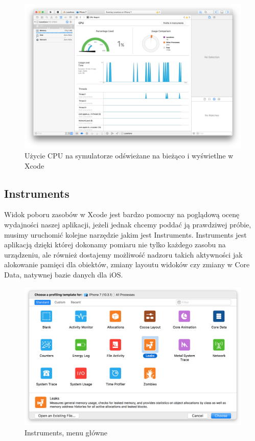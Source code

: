 \begin{figure}[ht!]
  \centering
  \includegraphics[width=120mm]{images/chapter-2-image-5-debugger.png}
  \caption{Użycie CPU na symulatorze odświeżane na bieżąco i wyświetlne w Xcode}
  \label{chapter-2-image-5-debugger}
\end{figure}

\subsection{Instruments}

Widok poboru zasobów w Xcode jest bardzo pomocny na poglądową ocenę wydajności naszej aplikacji, jeżeli jednak chcemy poddać ją prawdziwej próbie, musimy uruchomić kolejne narzędzie jakim jest Instruments. Instruments jest aplikacją dzięki której dokonamy pomiaru nie tylko każdego zasobu na urządzeniu, ale również dostajemy możliwość nadzoru takich aktywności jak alokowanie pamięci dla obiektów, zmiany layoutu widoków czy zmiany w Core Data, natywnej bazie danych dla iOS.

\begin{figure}[ht!]
  \centering
  \includegraphics[width=120mm]{images/chapter-2-image-6-instruments.png}
  \caption{Instruments, menu główne}
  \label{chapter-2-image-6-instruments}
\end{figure}


